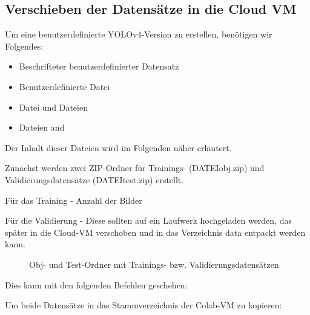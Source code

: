 \begin{code}[H]
	
	\caption{Nützliche Funktionen zum Anzeigen von Bildern, Hochladen oder Herunterladen von Bildern aus der Cloud VM} \label{ColabTensorFlow:Complete}
\end{code}

\subsection{Verschieben der Datensätze in die Cloud VM}

Um eine benutzerdefinierte YOLOv4-Version zu erstellen, benötigen wir Folgendes:

\begin{itemize}
	\item Beschrifteter benutzerdefinierter Datensatz
	\item Benutzerdefinierte Datei  
	\item Datei  und  Dateien 
	\item Dateien   and  
\end{itemize}

Der Inhalt dieser Dateien wird im Folgenden näher erläutert.

Zunächst werden zwei ZIP-Ordner für Trainings- (DATEI{obj.zip}) und Validierungsdatensätze (DATEI{test.zip}) erstellt. 

Für das Training - Anzahl der Bilder

Für die Validierung - 
Diese sollten auf ein Laufwerk hochgeladen werden, das später in die Cloud-VM verschoben und in das Verzeichnis \glqq data\grqq{} entpackt werden kann.

\begin{figure}[H]
	\centering
	\caption{Obj- und Test-Ordner mit Trainings- bzw. Validierungsdatensätzen}
\end{figure}

Dies kann mit den folgenden Befehlen geschehen: 

Um beide Datensätze in das Stammverzeichnis der Colab-VM zu kopieren:

\medskip


\medskip


\medskip


